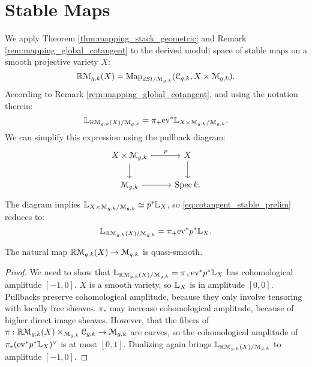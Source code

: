 \section{Stable Maps}
We apply Theorem \ref{thm:mapping_stack_geometric} and Remark \ref{rem:mapping_global_cotangent} to the derived 
moduli space of stable maps on a smooth projective
variety $X$:
\[	\mathbb R\mathcal{M}_{g,k}(X) = \operatorname{Map}_{dSt/\mathcal{M}_{g,k}}(\mathcal{C}_{g,k},X\times \mathcal{M}_{g,k}).	\]
According to Remark \ref{rem:mapping_global_cotangent}, and using the notation therein:
\begin{equation}
\label{eq:cotangent_stable_prelim}
	\mathbb L_{\mathbb R\mathcal{M}_{g,k}(X)/\mathcal{M}_{g,k}} = \pi_+ \mathrm{ev}^* \mathbb L_{X\times \mathcal{M}_{g,k}/\mathcal{M}_{g,k}}.
\end{equation}
We can simplify this expression using the pullback diagram:
\[
\begin{tikzcd}
X \times \mathcal{M}_{g,k}\arrow{r}{p}\arrow{d} & X\arrow{d} \\ \mathcal{M}_{g,k}\arrow{r} & \Spec k .
\end{tikzcd}
\]
The diagram implies $\mathbb L_{X\times \mathcal{M}_{g,k}/\mathcal{M}_{g,k}} \simeq p^* \mathbb L_X$, so \ref{eq:cotangent_stable_prelim}
reduces to:
\begin{equation}
\label{eq:cotangent_stable}
	\mathbb L_{\mathbb R\mathcal{M}_{g,k}(X)/\mathcal{M}_{g,k}} = \pi_+ \mathrm{ev}^* p^* \mathbb L_{X}.
\end{equation}

\begin{prop}
The natural map $\mathbb R \mathcal{M}_{g,k}(X) \to \mathcal{M}_{g,k}$ is quasi-smooth.
\end{prop}
\begin{proof}
We need to show that $\mathbb L_{\mathbb R\mathcal{M}_{g,k}(X)/\mathcal{M}_{g,k}} = \pi_+ \mathrm{ev}^* p^* \mathbb L_{X}$ has cohomological amplitude
$[-1,0]$. $X$ is a smooth variety, so $\mathbb L_X$ is in amplitude $[0,0]$. Pullbacks preserve cohomological amplitude, because
they only involve tensoring with locally free sheaves.  $\pi_*$ may increase cohomological
amplitude, because of higher direct image sheaves. However, that the fibers of $\pi : \mathbb R\mathcal{M}_{g,k}(X) 
\times_{\mathcal{M}_{g,k}} \mathcal{C}_{g,k} \to \mathcal{M}_{g,k}$ are curves, so the cohomological amplitude of
$\pi_* (\mathrm{ev}^* p^* \mathbb L_{X})^{\vee}$ is at most $[0,1]$. Dualizing again brings $\mathbb L_{\mathbb R\mathcal{M}_{g,k}(X)/\mathcal{M}_{g,k}}$
to amplitude $[-1,0]$.
\end{proof}

